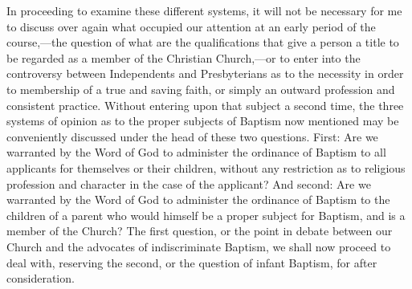 \documentclass[]{book}
\begin{document}
In proceeding to examine these different systems, it will not be necessary for me to discuss over again what occupied our attention at an early period of the course,---the question of what are the qualifications that give a person a title to be regarded as a member of the Christian Church,---or to enter into the controversy between Independents and Presbyterians as to the necessity in order to membership of a true and saving faith, or simply an outward profession and consistent practice. Without entering upon that subject a second time, the three systems of opinion as to the proper subjects of Baptism now mentioned may be conveniently discussed under the head of these two questions. First: Are we warranted by the Word of God to administer the ordinance of Baptism to all applicants for themselves or their children, without any restriction as to religious profession and character in the case of the applicant? And second: Are we warranted by the Word of God to administer the ordinance of Baptism to the children of a parent who would himself be a proper subject for Baptism, and is a member of the Church? The first question, or the point in debate between our Church and the advocates of indiscriminate Baptism, we shall now proceed to deal with, reserving the second, or the question of infant Baptism, for after consideration.
\end{document}
